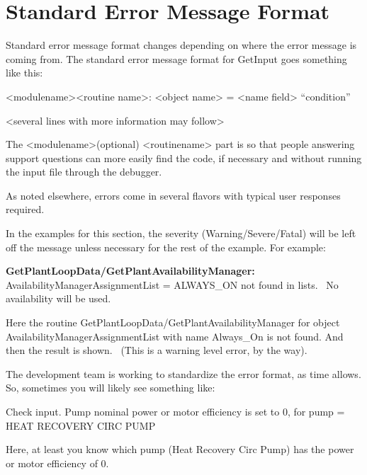 \section{Standard Error Message Format}\label{standard-error-message-format}

Standard error message format changes depending on where the error message is coming from. The standard error message format for GetInput goes something like this:

\textless{}modulename\textgreater{}\textless{}routine name\textgreater{}: \textless{}object name\textgreater{} = \textless{}name field\textgreater{} ``condition''

\textless{}several lines with more information may follow\textgreater{}

The \textless{}modulename\textgreater{}(optional) \textless{}routinename\textgreater{} part is so that people answering support questions can more easily find the code, if necessary and without running the input file through the debugger.

As noted elsewhere, errors come in several flavors with typical user responses required.

In the examples for this section, the severity (Warning/Severe/Fatal) will be left off the message unless necessary for the rest of the example. For example:

\textbf{GetPlantLoopData/GetPlantAvailabilityManager:} AvailabilityManagerAssignmentList = ALWAYS\_ON not found in lists.~ No availability will be used.

Here the routine GetPlantLoopData/GetPlantAvailabilityManager for object AvailabilityManagerAssignmentList with name Always\_On is not found. And then the result is shown.~ (This is a warning level error, by the way).

The development team is working to standardize the error format, as time allows. So, sometimes you will likely see something like:

Check input. Pump nominal power or motor efficiency is set to 0, for pump = HEAT RECOVERY CIRC PUMP

Here, at least you know which pump (Heat Recovery Circ Pump) has the power or motor efficiency of 0.
